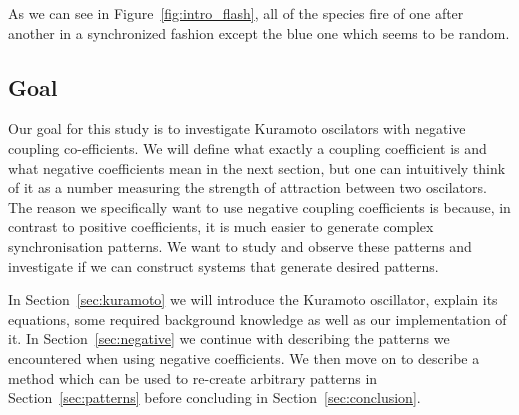 As we can see in Figure~\ref{fig:intro_flash}, all of the species fire of one after another in a synchronized fashion except the blue one which seems to be random. 

\subsection{Goal}
Our goal for this study is to investigate Kuramoto oscilators with negative coupling co-efficients. We will define what exactly a coupling coefficient is and what negative coefficients mean in the next section, but one can intuitively think of it as a number measuring the strength of attraction between two oscilators. 
The reason we specifically want to use negative coupling coefficients is because, in contrast to positive coefficients, it is much easier to generate complex synchronisation patterns. We want to study and observe these patterns and investigate if we can construct systems that generate desired patterns. 

In Section~\ref{sec:kuramoto} we will introduce the Kuramoto oscillator, explain its equations, some required background knowledge as well as our implementation of it. In Section~\ref{sec:negative} we continue with describing the patterns we encountered when using negative coefficients. We then move on to describe a method which can be used to re-create arbitrary patterns in Section~\ref{sec:patterns} before concluding in Section~\ref{sec:conclusion}. 